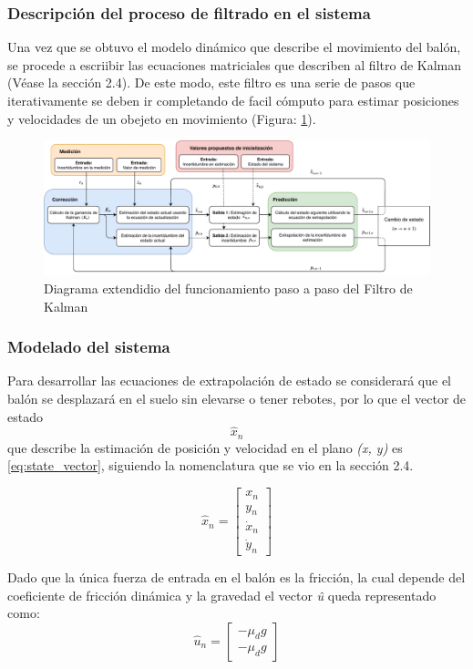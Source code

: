 		\subsubsection*{Descripción del proceso de filtrado en el sistema}
Una vez que se obtuvo el modelo dinámico que describe el movimiento del balón, se procede a escriibir las ecuaciones matriciales que describen al filtro de Kalman (Véase la sección 2.4). De este modo, este filtro es una serie de pasos que iterativamente se deben ir completando de facil cómputo para estimar posiciones y velocidades de un obejeto en movimiento (Figura: \ref{fig:kalman_extended_diagram}).

\begin{figure}
\centering
\includegraphics[scale=0.6]{images/kalman_extended_diagram.pdf}
\caption{Diagrama extendidio del funcionamiento paso a paso del Filtro de Kalman}
\label{fig:kalman_extended_diagram}
\end{figure}

		\subsubsection*{Modelado del sistema}
Para desarrollar las ecuaciones de extrapolación de estado se considerará que el balón se desplazará en el suelo sin elevarse o tener rebotes, por lo que el vector de estado $$\hat{x}_n$$ que describe la estimación de posición y velocidad en el plano \textit{(x, y)} es \ref{eq:state_vector}, siguiendo la nomenclatura que se vio en la sección 2.4.

\begin{equation}
\hat{x}_n = \begin{bmatrix}
x_n\\ 
y_n\\ 
\dot{x}_n\\ 
\dot{y}_n
\end{bmatrix}
\label{eq:state_vector}
\end{equation}

Dado que la única fuerza de entrada en el balón es la fricción, la cual depende del coeficiente de fricción dinámica y la gravedad el vector \textit{û} queda representado como:
\begin{equation}
\hat{u}_n = \begin{bmatrix}
-\mu_d g\\
-\mu_d g
\end{bmatrix}
\label{eq:input_signal}
\end{equation}

